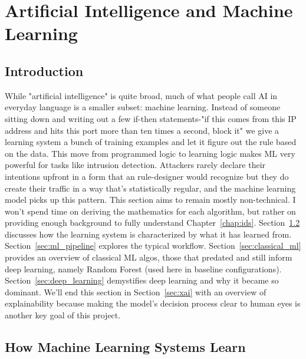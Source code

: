 
\chapter{Artificial Intelligence and Machine Learning}
\label{chap:ai}

\section{Introduction}

While "artificial intelligence" is quite broad, much of what people call AI in everyday language is a smaller subset: machine learning. Instead of someone sitting down and writing out a few if-then statements-"if this comes from this IP address and hits this port more than ten times a second, block it" we give a learning system a bunch of training examples and let it figure out the rule based on the data. This move from programmed logic to learning logic makes ML very powerful for tasks like intrusion detection. Attackers rarely declare their intentions upfront in a form that an rule-designer would recognize but they do create their traffic in a way that’s statistically regular, and the machine learning model picks up this pattern.
This section aims to remain mostly non-technical. I won't spend time on deriving the mathematics for each algorithm, but rather on providing enough background to fully understand Chapter~\ref{chap:ids}.
Section~\ref{sec:ml_types} discusses how the learning system is characterized by what it has learned from. 
Section~\ref{sec:ml_pipeline} explores the typical workflow. 
Section~\ref{sec:classical_ml} provides an overview of classical ML algos, those that predated and still inform deep learning, namely Random Forest (used here in baseline configurations). Section~\ref{sec:deep_learning} demystifies deep learning and why it became so dominant. We’ll end this section in Section~\ref{sec:xai} with an overview of explainability because making the model’s decision process clear to human eyes is another key goal of this project.

\section{How Machine Learning Systems Learn}
\label{sec:ml_types}

